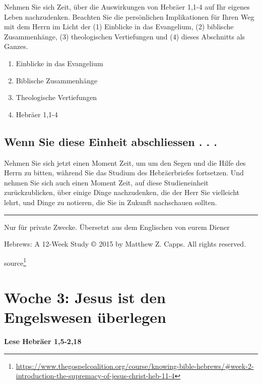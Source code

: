 \documentclass[
  12pt,
]{krantz}
\makeatletter
\providecommand{\tightlist}{%
  \setlength{\itemsep}{0pt}\setlength{\parskip}{0pt}}
\newenvironment{kframe}{%
\medskip{}
\setlength{\fboxsep}{.8em}
 \def\at@end@of@kframe{}%
 \ifinner\ifhmode%
  \def\at@end@of@kframe{\end{minipage}}%
  \begin{minipage}{\columnwidth}%
 \fi\fi%
 \def\FrameCommand##1{\hskip\@totalleftmargin \hskip-\fboxsep
 \colorbox{shadecolor}{##1}\hskip-\fboxsep
     \hskip-\linewidth \hskip-\@totalleftmargin \hskip\columnwidth}%
 \MakeFramed {\advance\hsize-\width
   \@totalleftmargin\z@ \linewidth\hsize
   \@setminipage}}%
 {\par\unskip\endMakeFramed%
 \at@end@of@kframe}
\newenvironment{rmdblock}[1]
  {
  \begin{itemize}
  \renewcommand{\labelitemi}{
    \raisebox{-.7\height}[0pt][0pt]{
      {\setkeys{Gin}{width=3em,keepaspectratio}\texttt{[image: img/\#1]}}
    }
  }
  \setlength{\fboxsep}{1em}
  \begin{kframe}
  \item
  }
  {
  \end{kframe}
  \end{itemize}
  }
\newenvironment{rmdbible}
  {\begin{rmdblock}{bible}}
  {\end{rmdblock}}
\renewcommand{\href}[2]{#2\footnote{\url{#1}}}
\makeatother
\begin{document}
Nehmen Sie sich Zeit, über die Auswirkungen von Hebräer 1,1-4 auf Ihr eigenes Leben nachzudenken. Beachten Sie die persönlichen Implikationen für Ihren Weg mit dem Herrn im Licht der (1) Einblicke in das Evangelium, (2) biblische Zusammenhänge, (3) theologischen Vertiefungen und (4) dieses Abschnitts als Ganzes.

\begin{enumerate}
\def\labelenumi{\arabic{enumi}.}
\tightlist
\item
  Einblicke in das Evangelium
\item
  Biblische Zusammenhänge
\item
  Theologische Vertiefungen
\item
  Hebräer 1,1-4
\end{enumerate}

\hypertarget{wenn-sie-diese-einheit-abschliessen-.-.-.}{%
\section{Wenn Sie diese Einheit abschliessen . . .}\label{wenn-sie-diese-einheit-abschliessen-.-.-.}}

Nehmen Sie sich jetzt einen Moment Zeit, um um den Segen und die Hilfe des Herrn zu bitten, während Sie das Studium des Hebräerbriefes fortsetzen. Und nehmen Sie sich auch einen Moment Zeit, auf diese Studieneinheit zurückzublicken, über einige Dinge nachzudenken, die der Herr Sie vielleicht lehrt, und Dinge zu notieren, die Sie in Zukunft nachschauen sollten.

\begin{center}\rule{0.5\linewidth}{0.5pt}\end{center}

Nur für private Zwecke. Übersetzt aus dem Englischen von eurem Diener

Hebrews: A 12-Week Study \(\copyright\) 2015 by Matthew Z. Capps. All rights reserved.

\href{https://www.thegospelcoalition.org/course/knowing-bible-hebrews/\#week-2-introduction-the-supremacy-of-jesus-christ-heb-11-4}{source}

\hypertarget{woche03}{%
\chapter{Woche 3: Jesus ist den Engelswesen überlegen}\label{woche03}}

\begin{rmdbible}
\textbf{Lese Hebräer 1,5-2,18}
\end{rmdbible}
\end{document}
